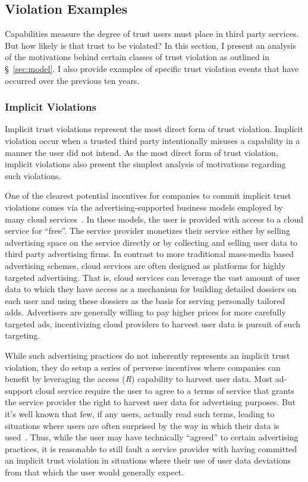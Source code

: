 \subsection{Violation Examples}
\label{sec:analysis:violations}

Capabilities measure the degree of trust users must place in third
party services. But how likely is that trust to be violated? In this
section, I present an analysis of the motivations behind certain
classes of trust violation as outlined in \S~\ref{sec:model}. I also
provide examples of specific trust violation events that have occurred
over the previous ten years.

\subsubsection{Implicit Violations}

Implicit trust violations represent the most direct form of trust
violation. Implicit violation occur when a trusted third party
intentionally misuses a capability in a manner the user did not
intend. As the most direct form of trust violation, implicit
violations also present the simplest analysis of motivations regarding
such violations.

One of the clearest potential incentives for companies to commit
implicit trust violations comes via the advertising-supported business
models employed by many cloud services~\cite{evans2009}. In these
models, the user is provided with access to a cloud service for
``free''. The service provider monetizes their service either by
selling advertising space on the service directly or by collecting and
selling user data to third party advertising firms. In contrast to
more traditional mass-media based advertising schemes, cloud services
are often designed as platforms for highly targeted advertising. That
is, cloud services can leverage the vast amount of user data to which
they have access as a mechanism for building detailed dossiers on each
user and using these dossiers as the basis for serving personally
tailored adds. Advertisers are generally willing to pay higher prices
for more carefully targeted ads, incentivizing cloud providers to
harvest user data is pursuit of such targeting.

While such advertising practices do not inherently represents an
implicit trust violation, they do setup a series of perverse
incentives where companies can benefit by leveraging the access
(\emph{R}) capability to harvest user data. Most ad-support cloud
service require the user to agree to a terms of service that grants
the service provider the right to harvest user data for advertising
purposes. But it's well known that few, if any users, actually read
such terms, leading to situations where users are often surprised by
the way in which their data is used~\cite{ hern2015,
  mcdonald2010}. Thus, while the user may have technically ``agreed''
to certain advertising practices, it is reasonable to still fault a
service provider with having committed an implicit trust violation in
situations where their use of user data deviations from that which the
user would generally expect.


